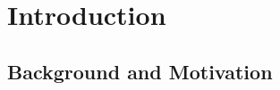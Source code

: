 \chapter{Introduction}
\label{cha:introduction}

\section{Background and Motivation}\label{sec:background-and-motivation}
\label{sec:BackgroundAndMotivation}

